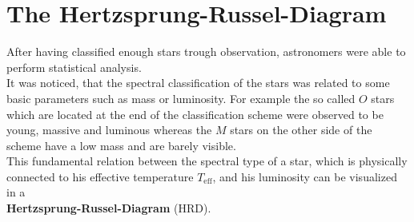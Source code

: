 \section{The Hertzsprung-Russel-Diagram}
After having classified enough stars trough observation, astronomers were able to perform statistical analysis. \\
It was noticed, that the spectral classification of the stars was related to some basic parameters such as mass or luminosity. For example the so called $O$ stars which are located at the end of the classification scheme were observed to be young, massive and luminous whereas the $M$ stars on the other side of the scheme have a low mass and are barely visible. \\
This fundamental relation between the spectral type of a star, which is physically connected to his effective temperature $T_{\text{eff}}$, and his luminosity can be visualized in a \\ \textbf{Hertzsprung-Russel-Diagram} (HRD). 

